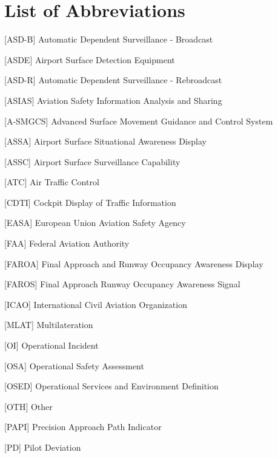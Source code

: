 \chapter*{List of Abbreviations}



\begin{acronym}
       [ASD-B]   {Automatic Dependent Surveillance - Broadcast}
    
     [ASDE] {Airport Surface Detection Equipment}
    
       [ASD-R]   {Automatic Dependent Surveillance - Rebroadcast}    
    
     [ASIAS] {Aviation Safety Information Analysis and Sharing}

     [A-SMGCS] {Advanced Surface Movement Guidance and Control System}
    
     [ASSA]  {Airport Surface Situational Awareness Display}

     [ASSC]  {Airport Surface Surveillance Capability}
    
     [ATC] {Air Traffic Control}

     [CDTI] {Cockpit Display of Traffic Information}
    
     [EASA] { European Union Aviation Safety Agency}
    
     [FAA] {Federal Aviation Authority}
    
     [FAROA] {Final Approach and Runway Occupancy Awareness Display}

     [FAROS] {Final Approach Runway Occupancy Awareness Signal}
    
     [ICAO] {International Civil Aviation Organization}

     [MLAT] {Multilateration}
    
     [OI] {Operational Incident}

     [OSA] {Operational Safety Assessment}

     [OSED] { Operational Services and Environment Definition}

     [OTH] {Other}

     [PAPI] {Precision Approach Path Indicator}
    
     [PD] {Pilot Deviation}


\end{acronym}
